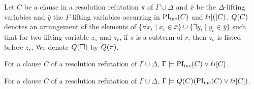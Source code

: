 \documentclass[,%
	draft=false,%
	numbers=noendperiod
	11pt,
	a4paper,
	oneside,%
	openany,
]{memoir}
\begin{document}
\begin{defi}
	\label{def:arrow_quantifier_block}
	Let $C$ be a clause in a resolution refutation $\pi$ of $\Gamma\cup\Delta$
	and $\bar x$ be the $\Delta$-lifting variables and $\bar y$ the $\Gamma$-lifting variables occurring in $\operatorname{PI}_{\operatorname{inc}}(C)$ and $\mathop{\ell\text{}i}[(]C)$.
	$Q(C)$ denotes an arrangement of the elements of  $\{ \forall x_t \mid x_t \in \bar x\} \cup \{ \exists y_t \mid y_t \in \bar y\}$ such that for two lifting variable $z_s$ and $z_r$, if $s$ is a subterm of $r$, then $z_s$ is listed before $z_r$.
	We denote $Q(\square)$ by $Q(\pi)$.
\end{defi}

\begin{clemma}
	For a clause $C$ of a resolution refutation of $\Gamma\cup\Delta$, 
	$\Gamma\models \operatorname{PI}_{\operatorname{inc}}(C) \lor \mathop{\ell\text{}i}[C]$.
\end{clemma}



\begin{clemma}
	For a clause $C$ of a resolution refutation of $\Gamma\cup\Delta$, 
	$\Gamma\models Q(C)(\operatorname{PI}_{\operatorname{inc}}(C) \lor \mathop{\ell\text{}i}[C])$.
\end{clemma}
\end{document}
